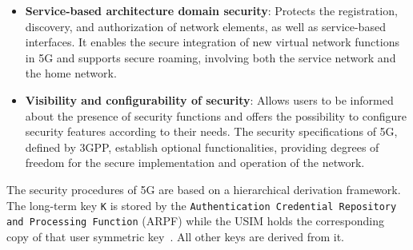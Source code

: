\documentclass[english]{article}
\begin{document}
\begin{itemize}
	\item \textbf{Service-based architecture domain security}:
	      Protects the registration, discovery, and authorization of
	      network elements, as well as service-based interfaces.
	      It enables the secure integration of new virtual network
	      functions in 5G and supports secure roaming,
	      involving both the service network and the home network.
	\item \textbf{Visibility and configurability of security}:
	      Allows users to be informed about the presence of security
	      functions and offers the possibility to configure security
	      features according to their needs. The security specifications
	      of 5G, defined by 3GPP, establish optional functionalities,
	      providing degrees of freedom for the secure implementation
	      and operation of the network.
\end{itemize}

The security procedures of 5G are based on a hierarchical derivation framework.
The long-term key \texttt{K} is stored by the \texttt{Authentication Credential
	Repository and Processing Function} (ARPF) while the USIM holds the
corresponding copy of that user symmetric key~\cite{Jover2018Security}. All
other keys are derived from it.
\end{document}
